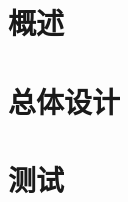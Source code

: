 \documentclass{article}
\begin{document}
	\tableofcontents
	\section{概述}
	
	
	
	\section{总体设计}
	
	
	\section{测试}
\end{document}
